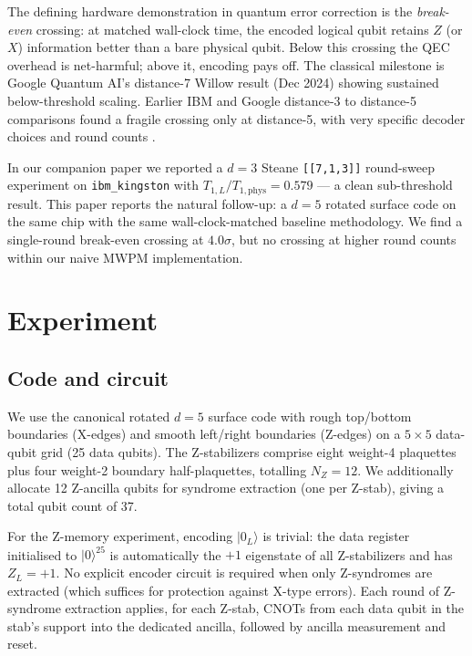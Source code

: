 \documentclass[11pt,letterpaper]{article}
\begin{document}
The defining hardware demonstration in quantum error correction is the \emph{break-even} crossing: at matched wall-clock time, the encoded logical qubit retains $Z$ (or $X$) information better than a bare physical qubit. Below this crossing the QEC overhead is net-harmful; above it, encoding pays off. The classical milestone is Google Quantum AI's distance-7 Willow result (Dec 2024) \cite{willow} showing sustained below-threshold scaling. Earlier IBM and Google distance-3 to distance-5 comparisons found a fragile crossing only at distance-5, with very specific decoder choices and round counts \cite{willow_precursor}.

In our companion paper \cite{steane_paper} we reported a $d = 3$ Steane \texttt{[[7,1,3]]} round-sweep experiment on \texttt{ibm\_kingston} with $T_{1,L} / T_{1,\mathrm{phys}} = 0.579$ --- a clean sub-threshold result. This paper reports the natural follow-up: a $d = 5$ rotated surface code on the same chip with the same wall-clock-matched baseline methodology. We find a single-round break-even crossing at $4.0\sigma$, but no crossing at higher round counts within our naive MWPM implementation.

\section{Experiment}

\subsection{Code and circuit}

We use the canonical rotated $d = 5$ surface code with rough top/bottom boundaries (X-edges) and smooth left/right boundaries (Z-edges) on a $5 \times 5$ data-qubit grid (25 data qubits). The Z-stabilizers comprise eight weight-4 plaquettes plus four weight-2 boundary half-plaquettes, totalling $N_Z = 12$. We additionally allocate 12 Z-ancilla qubits for syndrome extraction (one per Z-stab), giving a total qubit count of 37.

For the Z-memory experiment, encoding $|0_L\rangle$ is trivial: the data register initialised to $|0\rangle^{25}$ is automatically the $+1$ eigenstate of all Z-stabilizers and has $Z_L = +1$. No explicit encoder circuit is required when only Z-syndromes are extracted (which suffices for protection against X-type errors). Each round of Z-syndrome extraction applies, for each Z-stab, CNOTs from each data qubit in the stab's support into the dedicated ancilla, followed by ancilla measurement and reset.
\end{document}
